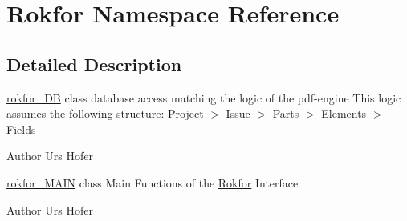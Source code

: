 \hypertarget{namespace_rokfor}{
\section{\-Rokfor \-Namespace \-Reference}
\label{namespace_rokfor}
}


\subsection{\-Detailed \-Description}
\hyperlink{classrokfor___d_b}{rokfor\-\_\-\-D\-B} class database access matching the logic of the pdf-\/engine \-This logic assumes the following structure\-: \-Project $>$ \-Issue $>$ \-Parts $>$ \-Elements $>$ \-Fields

\begin{DoxyAuthor}{\-Author}
\-Urs \-Hofer
\end{DoxyAuthor}
\hyperlink{classrokfor___m_a_i_n}{rokfor\-\_\-\-M\-A\-I\-N} class \-Main \-Functions of the \hyperlink{namespace_rokfor}{\-Rokfor} \-Interface

\begin{DoxyAuthor}{\-Author}
\-Urs \-Hofer 
\end{DoxyAuthor}
